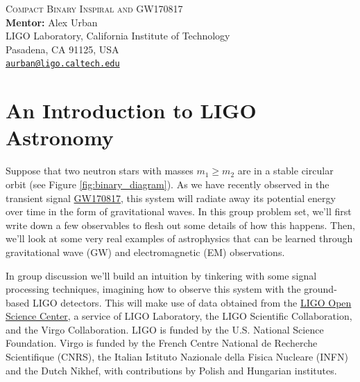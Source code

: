 \documentclass[11pt]{article}
\begin{document}
\begin{center}
{\Large\textsc{Compact Binary Inspiral and GW170817}} \\
\vspace{10pt}
{\large \textbf{Mentor:} Alex Urban} \\
{\small LIGO Laboratory, California Institute of Technology \\
Pasadena, CA 91125, USA \\
\href{mailto:aurban@ligo.caltech.edu}{\texttt{aurban@ligo.caltech.edu}}}
\end{center}


\section*{An Introduction to LIGO Astronomy}
\hspace{15pt} Suppose that two neutron stars with masses $m_1 \geq m_2$ are in a stable circular orbit (see Figure \ref{fig:binary_diagram}).
As we have recently observed in the transient signal \href{https://journals.aps.org/prl/pdf/10.1103/PhysRevLett.119.161101}{GW170817}, this
system will radiate away its potential energy over time in the form of gravitational waves. In this group problem set, we'll first write down
a few observables to flesh out some details of how this happens. Then, we'll look at some very real examples of astrophysics that can be
learned through gravitational wave (GW) and electromagnetic (EM) observations.

In group discussion we'll build an intuition by tinkering with some signal processing techniques, imagining how to observe this system with the
ground-based LIGO detectors. This will make use of data obtained from the \href{https://losc.ligo.org}{LIGO Open Science Center}, a service of
LIGO Laboratory, the LIGO Scientific Collaboration, and the Virgo Collaboration. LIGO is funded by the U.S. National Science Foundation. Virgo
is funded by the French Centre National de Recherche Scientifique (CNRS), the Italian Istituto Nazionale della Fisica Nucleare (INFN) and the
Dutch Nikhef, with contributions by Polish and Hungarian institutes.

\vspace{20pt}
\end{document}
